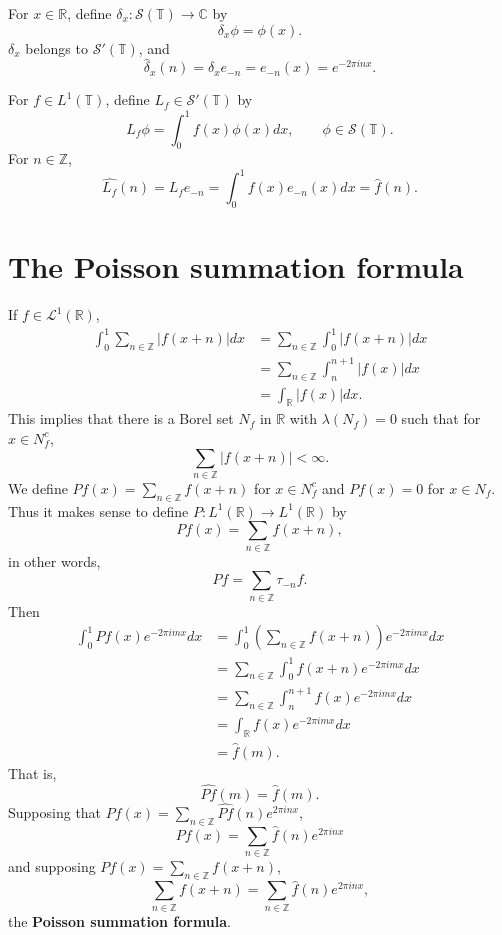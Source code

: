 \documentclass{article}
\theoremstyle{definition}
\begin{document}
For $x \in \mathbb{R}$, define $\delta_x:\mathscr{S}(\mathbb{T}) \to \mathbb{C}$ by
\[
\delta_x \phi = \phi(x).
\]
$\delta_x$ belongs to $\mathscr{S}'(\mathbb{T})$, and
\[
\widehat{\delta}_x(n) = \delta_x e_{-n} = e_{-n}(x) = e^{-2\pi inx}.
\]



For $f \in L^1(\mathbb{T})$, define $L_f \in \mathscr{S}'(\mathbb{T})$ by
\[
L_f \phi = \int_0^1 f(x) \phi(x) dx,\qquad \phi \in \mathscr{S}(\mathbb{T}).
\]
For $n \in \mathbb{Z}$,
\[
\widehat{L_f}(n) = L_f e_{-n} = \int_0^1 f(x) e_{-n}(x) dx = \widehat{f}(n).
\]




\section{The Poisson summation formula}
If $f \in \mathscr{L}^1(\mathbb{R})$, 
\begin{align*}
\int_0^1 \sum_{n \in \mathbb{Z}} |f(x+n)| dx&=\sum_{n \in \mathbb{Z}} \int_0^1 |f(x+n)| dx\\
&=\sum_{n \in \mathbb{Z}} \int_n^{n+1} |f(x)| dx\\
&=\int_{\mathbb{R}} |f(x)| dx.
\end{align*}
This implies that there is a Borel set $N_f$ in $\mathbb{R}$ with $\lambda(N_f)=0$ such that
for  $x \in N_f^c$,
\[
\sum_{n \in \mathbb{Z}} |f(x+n)| < \infty.
\]
We define $Pf(x)=\sum_{n \in \mathbb{Z}} f(x+n)$ for $x \in N_f^c$ and $Pf(x)=0$ for $x \in N_f$. Thus it makes sense to define
$P:L^1(\mathbb{R}) \to L^1(\mathbb{R})$ by
\[
Pf(x) = \sum_{n \in \mathbb{Z}} f(x+n),
\]
in other words,
\[
Pf = \sum_{n \in \mathbb{Z}} \tau_{-n}f.
\]
Then
\begin{align*}
\int_0^1 Pf(x) e^{-2\pi imx} dx&=\int_0^1 \left( \sum_{n \in \mathbb{Z}} f(x+n) \right)e^{-2\pi imx} dx\\
&=\sum_{n \in \mathbb{Z}} \int_0^1 f(x+n) e^{-2\pi imx} dx\\
&=\sum_{n \in \mathbb{Z}} \int_n^{n+1} f(x) e^{-2\pi imx} dx\\
&=\int_{\mathbb{R}} f(x) e^{-2\pi imx} dx\\
&=\widehat{f}(m).
\end{align*}
That is,
\[
\widehat{P f}(m) = \widehat{f}(m).
\]
Supposing that $Pf(x) = \sum_{n \in \mathbb{Z}} \widehat{Pf}(n) e^{2\pi inx}$, 
\[
Pf(x) = \sum_{n \in \mathbb{Z}} \widehat{f}(n) e^{2\pi inx}
\]
and supposing $Pf(x)=\sum_{n \in \mathbb{Z}} f(x+n)$,
\[
\sum_{n \in \mathbb{Z}} f(x+n) = \sum_{n \in \mathbb{Z}} \widehat{f}(n) e^{2\pi inx},
\]
the \textbf{Poisson summation formula}.
\end{document}
